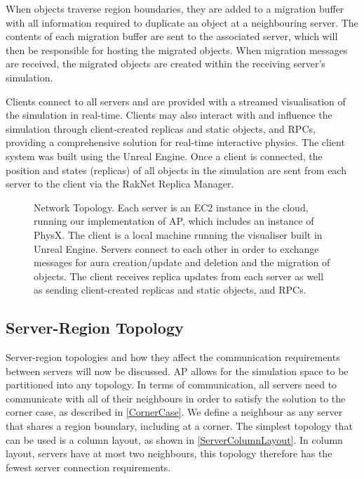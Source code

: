 When objects traverse region boundaries, they are added to a migration buffer with all information required to duplicate an object at a neighbouring server. The contents of each migration buffer are sent to the associated server, which will then be responsible for hosting the migrated objects. When migration messages are received, the migrated objects are created within the receiving server's simulation.

Clients connect to all servers and are provided with a streamed visualisation of the simulation in real-time. Clients may also interact with and influence the simulation through client-created replicas and static objects, and RPCs, providing a comprehensive solution for real-time interactive physics. The client system was built using the Unreal Engine. Once a client is connected, the position and states (replicas) of all objects in the simulation are sent from each server to the client via the RakNet Replica Manager.


\begin{figure}[h]
	\centering
	\scalebox{1.5}{}
	\caption{Network Topology. Each server is an EC2 instance in the cloud, running our implementation of AP, which includes an instance of PhysX. The client is a local machine running the visualiser built in Unreal Engine. Servers connect to each other in order to exchange messages for aura creation/update and deletion and the migration of objects. The client receives replica updates from each server as well as sending client-created replicas and static objects, and RPCs.}
\end{figure}


\subsection{Server-Region Topology}
Server-region topologies and how they affect the communication requirements between servers will now be discussed. 
AP allows for the simulation space to be partitioned into any topology. In terms of communication, all servers need to communicate with all of their neighbours in order to satisfy the solution to the corner case, as described in \ref{CornerCase}. We define a neighbour as any server that shares a region boundary, including at a corner. The simplest topology that can be used is a column layout, as shown in \ref{ServerColumnLayout}. In column layout, servers have at most two neighbours, this topology therefore has the fewest server connection requirements.

